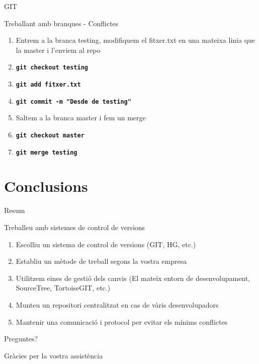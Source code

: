 \documentclass[10pt,xcolor={rgb}]{beamer}
\begin{document}
    \begin{frame}[fragile]{GIT}
      \begin{block}{Treballant amb branques - Conflictes}

        \begin{enumerate}
          \item Entrem a la branca testing, modifiquem el fitxer.txt en una mateixa linia que la master i l'enviem al repo
          \item \texttt{\textbf{git checkout testing}}
          \item \texttt{\textbf{git add fitxer.txt}}
          \item \texttt{\textbf{git commit -m "Desde de testing"}}
          \item Saltem a la branca master i fem un merge
          \item \texttt{\textbf{git checkout master}}
          \item \texttt{\textbf{git merge testing}}
        \end{enumerate}

      \end{block}
    \end{frame}

    \section{Conclusions}
    
    \begin{frame}{Resum}
      \begin{block}{Treballeu amb sistemes de control de versions}
        
                \begin{enumerate}
                  \item Escolliu un sistema de control de versions (GIT, HG, etc.)
                  \item Establiu un mètode de treball segons la vostra empresa
                  \item Utilitzem eines de gestió dels canvis (El mateix entorn de desenvolupament, SourceTree, TortoiseGIT, etc.)
                  \item Munteu un repositori centralitzat en cas de vàris desenvolupadors
                  \item Mantenir una comunicació i protocol per evitar els mínims conflictes
                \end{enumerate}
        
              \end{block}
    \end{frame}
    
    \begin{frame}[standout]
      Preguntes?
    \end{frame}

    \begin{frame}{}
      Gràcies per la vostra assistència
    \end{frame}
    
\end{document}
